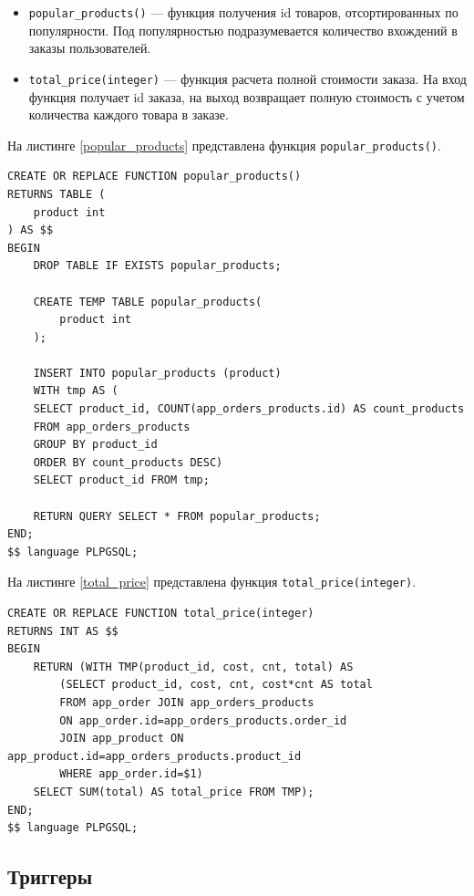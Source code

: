 \begin{itemize}
	\item \verb;popular_products(); --- функция получения id товаров, отсортированных по популярности. Под популярностью подразумевается количество вхождений в заказы пользователей.
	\item \verb;total_price(integer); --- функция расчета полной стоимости заказа. На вход функция получает id заказа, на выход возвращает полную стоимость с учетом количества каждого товара в заказе.
\end{itemize}

На листинге \ref{popular_products} представлена функция \verb;popular_products();.

\captionsetup{singlelinecheck = false, justification=raggedright}
\begin{lstlisting}[label=popular_products,caption=Функция получения популярных товаров]
CREATE OR REPLACE FUNCTION popular_products()
RETURNS TABLE (
    product int
) AS $$
BEGIN
    DROP TABLE IF EXISTS popular_products;

    CREATE TEMP TABLE popular_products(
        product int
    );

    INSERT INTO popular_products (product)
    WITH tmp AS (
	SELECT product_id, COUNT(app_orders_products.id) AS count_products
	FROM app_orders_products
	GROUP BY product_id
	ORDER BY count_products DESC)
    SELECT product_id FROM tmp;

    RETURN QUERY SELECT * FROM popular_products;
END;
$$ language PLPGSQL;
\end{lstlisting}

На листинге \ref{total_price} представлена функция \verb;total_price(integer);.

\newpage

\captionsetup{singlelinecheck = false, justification=raggedright}
\begin{lstlisting}[label=total_price,caption=Функция получения общей суммы заказа по его id]
CREATE OR REPLACE FUNCTION total_price(integer)
RETURNS INT AS $$
BEGIN
    RETURN (WITH TMP(product_id, cost, cnt, total) AS 
        (SELECT product_id, cost, cnt, cost*cnt AS total
		FROM app_order JOIN app_orders_products 
        ON app_order.id=app_orders_products.order_id
        JOIN app_product ON app_product.id=app_orders_products.product_id 
        WHERE app_order.id=$1)
    SELECT SUM(total) AS total_price FROM TMP);
END;
$$ language PLPGSQL;
\end{lstlisting}

\subsection{Триггеры}

